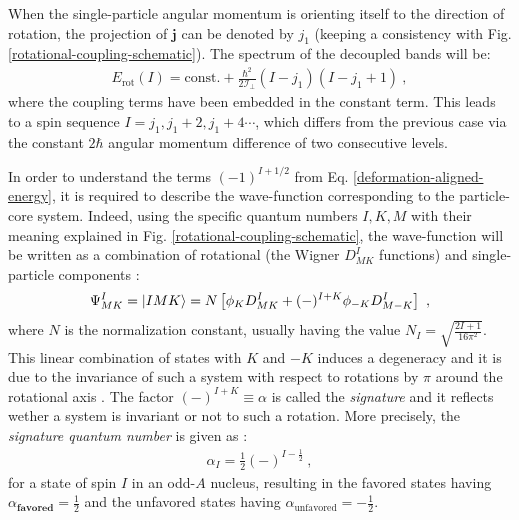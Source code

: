 When the single-particle angular momentum is orienting itself to the direction of rotation, the projection of $\mathbf{j}$ can be denoted by $j_1$ (keeping a consistency with Fig. \ref{rotational-coupling-schematic}). The spectrum of the decoupled bands will be:
\begin{align}
    E_\text{rot}(I)=\text{const.}+\frac{\hbar^2}{2\mathcal{I}_\perp}(I-j_1)(I-j_1+1)\ ,
\end{align}
where the coupling terms have been embedded in the constant term. This leads to a spin sequence $I=j_1,j_1+2,j_1+4\cdots$, which differs from the previous case via the constant $2\hbar$ angular momentum difference of two consecutive levels.

In order to understand the terms $(-1)^{I+1/2}$ from Eq. \ref{deformation-aligned-energy}, it is required to describe the wave-function corresponding to the particle-core system. Indeed, using the specific quantum numbers $I,K,M$ with their meaning explained in Fig. \ref{rotational-coupling-schematic}, the wave-function will be written as a combination of rotational (the Wigner $D_{MK}^I$ functions) and single-particle components \cite{wang2007exotic,davydov1958rotational}:
\begin{align}
    \Psi_{MK}^I=\ket{IMK}=N\left[\phi_K D_{MK}^I+(-)^{I+K}\phi_{-K}D_{M-K}^I\right]\ ,
    \label{RAL-bands-wave-function}
\end{align}
where $N$ is the normalization constant, usually having the value $N_I=\sqrt{\frac{2I+1}{16\pi^2}}$. This linear combination of states with $K$ and $-K$ induces a degeneracy and it is due to the invariance of such a system with respect to rotations by $\pi$ around the rotational axis \cite{frauendorf1997tilted,bohr1998nuclear}. The factor $(-)^{I+K}\equiv\alpha$ is called the \emph{signature} and it reflects wether a system is invariant or not to such a rotation. More precisely, the \emph{signature quantum number} is given as \cite{sun1994varied}:
\begin{align}
    \alpha_I=\frac{1}{2}(-)^{I-\frac{1}{2}}\ ,
\end{align}
for a state of spin $I$ in an odd-$A$ nucleus, resulting in the favored states having $\alpha_\textbf{favored}=\frac{1}{2}$ and the unfavored states having $\alpha_\text{unfavored}=-\frac{1}{2}$.


